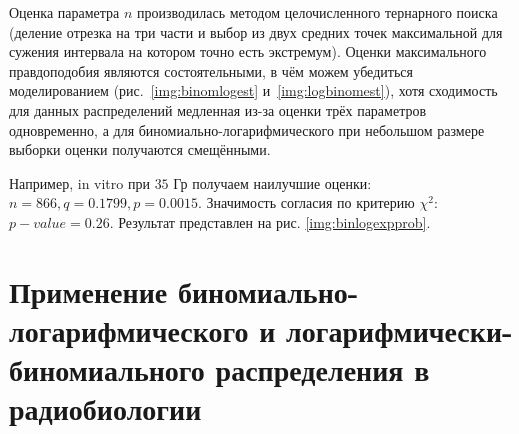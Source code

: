 \documentclass[12pt, specialist, subf, substylefile = spbu.rtx]{disser}
\begin{document}
	Оценка параметра $n$ производилась методом целочисленного тернарного поиска (деление отрезка на три части и выбор из двух средних точек максимальной для сужения интервала на котором точно есть экстремум). Оценки максимального правдоподобия являются состоятельными, в чём можем убедиться моделированием (рис.~\ref{img:binomlogest} и~\ref{img:logbinomest}), хотя сходимость для данных распределений медленная из-за оценки трёх параметров одновременно, а для биномиально-логарифмического при небольшом размере выборки оценки получаются смещёнными.
	
	Например, in vitro при $ 35 $ Гр получаем наилучшие оценки: $ n = 866, q = 0.1799, p = 0.0015$. Значимость согласия по критерию $ \chi ^2 $: $ p-value = 0.26 $. Результат представлен на рис. \ref{img:binlogexpprob}.
	
	\section{Применение биномиально-логарифмического и логарифмически-биномиального распределения в радиобиологии}
	
	\label{radiobiology}
	
\end{document}
